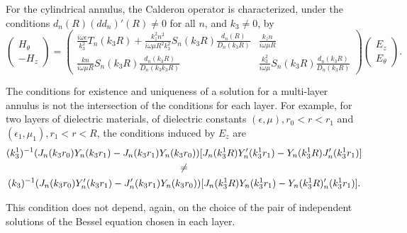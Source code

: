             \begin{lemma}
            \label{Z-lemme}
            For the cylindrical annulus, the Calderon operator is characterized, under the conditions $d_n(R)(dd_n)'(R)\not=0$ for all $n$, and $k_3\not=0$, by
            $$
            \begin{pmatrix}
                H_{\theta}
                \\
                -H_z
            \end{pmatrix}
            =
            \begin{pmatrix}
                \frac{i\omega \epsilon}{k_3^2}T_n(k_3R)+\frac{k_z^2n^2}{i\omega \mu R^2k_3^2}S_n(k_3R)\frac{d_n(R)}{D_n(k_3R)} & \frac{k_zn}{i\omega \mu R}
                \\
                \frac{kn}{i\omega \mu R}S_n(k_3R)\frac{d_n(k_3R)}{D_n(k_3k_3R)} & \frac{k_3^2}{i\omega \mu}S_n(k_3R)\frac{d_n(k_3R)}{D_n(k_3R)}
            \end{pmatrix}
            \begin{pmatrix}
                E_z
                \\
                E_{\theta}
            \end{pmatrix}.$$
            \end{lemma}

            \begin{remark}
                The conditions for existence and uniqueness of a solution for a multi-layer annulus is not the intersection of the conditions for each layer. For example, for two layers of dielectric materials, of dielectric constants $(\epsilon, \mu), r_0<r<r_1$ and $(\epsilon_1, \mu_1), r_1<r<R$, the conditions induced by $E_z$ are
                \begin{multline*}
                    (k_3^1)^{-1}(J_n(k_3r_0)Y_n(k_3r_1)-J_n(k_3r_1)Y_n(k_3r_0))[J_n(k_3^1R)Y'_n(k_3^1r_1)-Y_n(k_3^1R)J'_n(k_3^1r_1)]
                    \cr
                    \not=
                    \\
                    (k_3)^{-1}(J_n(k_3r_0)Y'_n(k_3r_1)-J'_n(k_3r_1)Y_n(k_3r_0))[J_n(k_3^1R)Y_n(k_3^1r_1)-Y_n(k_3^1R)'_n(k_3^1r_1)].
                \end{multline*}

                This condition does not depend, again, on the choice of the pair of independent solutions of the Bessel equation chosen in each layer.
            \end{remark}

